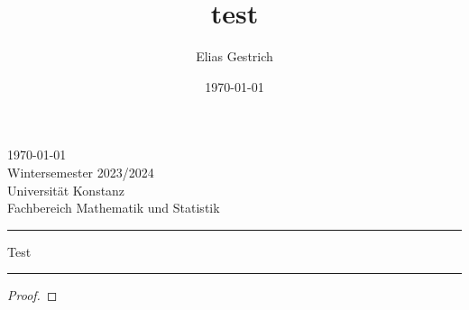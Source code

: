 \documentclass[a4paper, parskip = true, fleqn, headsepline = true]{scrartcl}
\title{test}
\author{Elias Gestrich}
\date{\today}
\begin{document}
\begingroup
\setlength\multicolsep{\baselineskip}
\begin{multicols}{2}
	\raggedright
	\today\\
	Wintersemester 2023/2024\\
	\columnbreak
	\raggedleft
	Universität Konstanz\\
	Fachbereich Mathematik und Statistik
\end{multicols}
\hrule height 0.8pt
\begin{center}
	\unskip
	{\LARGE Test}\\
\end{center}
\hrule
\thispagestyle{empty}
\endgroup

\lipsum[22]

\begin{example}
	\lipsum[21]
\end{example}
\begin{task}
	\lipsum[21]
\end{task}
\begin{problem}
	\lipsum[21]
\end{problem}
\begin{definition}
	\lipsum[21]
\end{definition}
\begin{theorem}	
	\lipsum[21]
\end{theorem}
\begin{lemma}
	\lipsum[21]
\end{lemma}
\begin{conjecture}
	\lipsum[21]
\end{conjecture}
\begin{proof}	
	\lipsum[21]
\end{proof}
\begin{corollary}
	\lipsum[21]
\end{corollary}
\begin{axiom}
	\lipsum[21]
\end{axiom}
\end{document}
